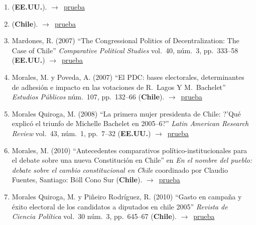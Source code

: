 \documentclass[12 pt, letter]{article}
\newenvironment{CitasMiTrabajo}{
    \begin{footnotesize}
    \begin{enumerate}[label={\footnotesize\emph{cita~\arabic*}},ref=\arabic*] %
        \setlength{\itemsep}{.1\itemsep}
        \setlength{\parskip}{.1\parskip}
    }{\end{enumerate}\end{footnotesize}}
\begin{document}
\begin{CitasMiTrabajo}
        \item {} (\textbf{EE.UU.}). $\rightarrow$~\href{https://academiccommons.columbia.edu/doi/10.7916/D8C827CS}{prueba}

        \item {} (\textbf{Chile}). $\rightarrow$~\href{https://scielo.conicyt.cl/scielo.php?pid=S0718-090X2019000100099&script=sci_arttext}{prueba}
          
        \item Mardones, R. (2007)
        ``The Congressional Politics of Decentralization: The Case of Chile'' \emph{Comparative
        Political Studies} vol.\ 40, n\'um.\ 3, pp.\ 333--58  (\textbf{EE.UU.}) $\rightarrow$~\href{https://github.com/emagar/cv/blob/master/citasMiTrab/mrs/mardones.pdf}{prueba}

        \item Morales, M. y Poveda, A. (2007)
        ``El PDC: bases electorales, determinantes de adhesi\'on e impacto en las votaciones de R.\ Lagos Y M.\ Bachelet''
        \emph{Estudios P\'ublicos} n\'um.\ 107, pp.\ 132--66  (\textbf{Chile}). $\rightarrow$~\href{https://github.com/emagar/cv/blob/master/citasMiTrab/mrs/morales+povedapdcbases.pdf}{prueba}

        \item Morales Quiroga, M. (2008)
        ``La primera mujer presidenta de Chile: ?'Qu\'e explic\'o el triunfo de Michelle Bachelet en 2005--6?''
        \emph{Latin American Research Review} vol.\ 43, n\'um.\ 1, pp.\ 7--32 (\textbf{EE.UU.}) $\rightarrow$~\href{https://github.com/emagar/cv/blob/master/citasMiTrab/mrs/morales2008larr.excerpt.pdf}{prueba}

        \item Morales, M. (2010)
        ``Antecedentes comparativos pol\'itico-institucionales para el debate sobre una nueva Constituci\'on en Chile''
        en \emph{En el nombre del pueblo: debate sobre el cambio constitucional en Chile} coordinado por Claudio Fuentes, Santiago: B\"oll Cono Sur (\textbf{Chile}). $\rightarrow$~\href{https://github.com/emagar/cv/blob/master/citasMiTrab/mrs/morales2010.excerpt.pdf}{prueba}

        \item Morales Quiroga, M. y Pi\~neiro Rodr\'iguez, R. (2010)
        ``Gasto en campa\~na y \'exito electoral de los candidatos a diputados en chile 2005''
        \emph{Revista de Ciencia Pol\'itica} vol.\ 30 n\'um.\ 3, pp.\ 645--67 (\textbf{Chile}). $\rightarrow$~\href{https://github.com/emagar/cv/blob/master/citasMiTrab/mrs/moralesPineiro2010rcp.pdf}{prueba}


\end{CitasMiTrabajo}
\end{document}
